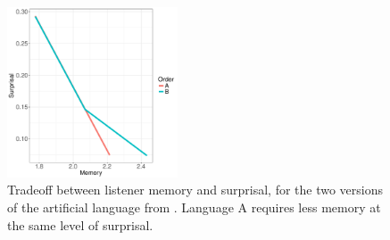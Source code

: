 \begin{figure}
\includegraphics[width=0.45\textwidth]{../code/toy/figures/toy-mem-surp.pdf}
	\caption{Tradeoff between listener memory and surprisal, for the two versions of the artificial language from \cite{fedzechkina-human-2017}. Language A requires less memory at the same level of surprisal.}\label{fig:toy-listener-tradeoff}
\end{figure}


